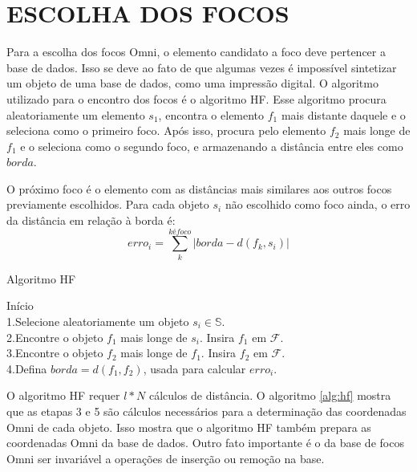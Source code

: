 \section{ESCOLHA DOS FOCOS}

Para a escolha dos focos Omni, o elemento candidato a foco deve pertencer a base de dados. Isso se deve ao fato de que algumas vezes
é impossível sintetizar um objeto de uma base de dados, como uma impressão digital. O algoritmo utilizado para o encontro dos focos
é o algoritmo HF. Esse algoritmo procura aleatoriamente um elemento $s_1$, encontra o elemento $f_1$ mais distante daquele e o seleciona como
o primeiro foco. Após isso, procura pelo elemento $f_2$ mais longe de $f_1$ e o seleciona como o segundo foco, e armazenando
a distância entre eles como $borda$.\par

O próximo foco é o elemento com as distâncias mais similares aos outros focos previamente escolhidos. Para cada objeto
$s_i$ não escolhido como foco ainda, o erro da distância em relação à borda é:
\begin{equation}
 erro_i = \sum_{k}^{k é foco} |borda - d(f_k, s_i)|
\end{equation}

\begin{algorithm}
\label{alg:hf}
    \caption{Algoritmo HF}
    Início\\
       1.Selecione aleatoriamente um objeto $s_i \in \mathbb{S}$.\\
       2.Encontre o objeto $f_1$ mais longe de $s_i$. Insira $f_1$ em $\mathscr{F}$.\\
       3.Encontre o objeto $f_2$ mais longe de $f_1$. Insira $f_2$ em $\mathscr{F}$.\\
       4.Defina $borda=d(f_1,f_2)$, usada para calcular $erro_i$.\\
\end{algorithm}

O algoritmo HF requer $l*N$ cálculos de distância. O algoritmo \ref{alg:hf} mostra que as etapas 3 e 5 são cálculos
necessários para a determinação das coordenadas Omni de cada objeto. Isso mostra que o algoritmo HF também prepara as
coordenadas Omni da base de dados. Outro fato importante é o da base de focos Omni ser invariável a operações de inserção
ou remoção na base.

